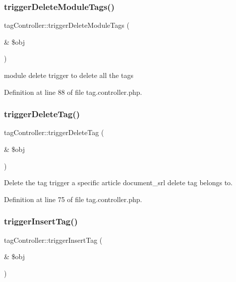 \hypertarget{classtagController_a923a01c674ed2ad08b6e25e88f1001cf}{}\label{classtagController_a923a01c674ed2ad08b6e25e88f1001cf} 
\subsubsection{\texorpdfstring{trigger\+Delete\+Module\+Tags()}{triggerDeleteModuleTags()}}
{\footnotesize\ttfamily tag\+Controller\+::trigger\+Delete\+Module\+Tags (\begin{DoxyParamCaption}\item[{\&}]{\$obj }\end{DoxyParamCaption})}



module delete trigger to delete all the tags 



Definition at line 88 of file tag.\+controller.\+php.

\hypertarget{classtagController_a10bdcf92aea9f67d9c827d910e4454c9}{}\label{classtagController_a10bdcf92aea9f67d9c827d910e4454c9} 
\subsubsection{\texorpdfstring{trigger\+Delete\+Tag()}{triggerDeleteTag()}}
{\footnotesize\ttfamily tag\+Controller\+::trigger\+Delete\+Tag (\begin{DoxyParamCaption}\item[{\&}]{\$obj }\end{DoxyParamCaption})}



Delete the tag trigger a specific article document\+\_\+srl delete tag belongs to. 



Definition at line 75 of file tag.\+controller.\+php.

\hypertarget{classtagController_ae17dc9d2d9f4d1193c4bb76e2296a060}{}\label{classtagController_ae17dc9d2d9f4d1193c4bb76e2296a060} 
\subsubsection{\texorpdfstring{trigger\+Insert\+Tag()}{triggerInsertTag()}}
{\footnotesize\ttfamily tag\+Controller\+::trigger\+Insert\+Tag (\begin{DoxyParamCaption}\item[{\&}]{\$obj }\end{DoxyParamCaption})}



